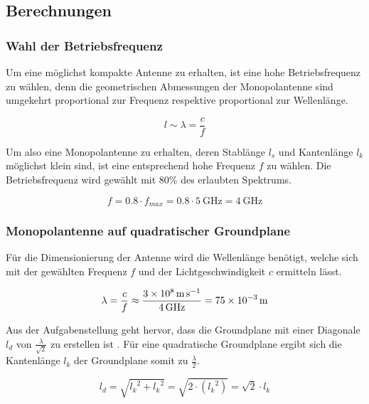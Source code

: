 \subsection{Berechnungen}

\subsubsection{Wahl der Betriebsfrequenz}

Um eine möglichst kompakte Antenne zu erhalten, ist eine hohe
Betriebsfrequenz zu wählen, denn die geometrischen Abmessungen
der Monopolantenne sind umgekehrt proportional zur Frequenz
respektive proportional zur Wellenlänge.

\begin{equation}
	l \sim \lambda = \frac{c}{f}
\end{equation}

Um also eine Monopolantenne zu erhalten, deren Stablänge $l_s$
und Kantenlänge $l_k$ möglichst klein sind, ist eine entsprechend
hohe Frequenz $f$ zu wählen. Die Betriebsfrequenz wird gewählt mit
80\% des erlaubten Spektrums.

\begin{equation}
	f
	= 0.8 \cdot f_{max}
	= 0.8 \cdot \SI{5}{\giga\hertz}
	= \SI{4}{\giga\hertz} 
\end{equation}

\subsubsection{Monopolantenne auf quadratischer Groundplane}

Für die Dimensionierung der Antenne wird die Wellenlänge benötigt,
welche sich mit der gewählten Frequenz $f$ und der Lichtgeschwindigkeit
$c$ ermitteln lässt.

\begin{equation}
	\lambda
	= \frac{c}{f}
	\approx \frac{\SI{3d8}{\meter\per\second}}{\SI{4}{\giga\hertz}}
	= \SI{75d-3}{\meter} 
\end{equation}

Aus der Aufgabenstellung geht hervor, dass die Groundplane mit einer
Diagonale $l_d$ von $\frac{\lambda}{\sqrt{2}}$ zu erstellen ist
\cite[S.1, 2a]{lab1}. Für eine quadratische Groundplane ergibt sich
die Kantenlänge $l_k$ der Groundplane somit zu $\frac{\lambda}{2}$.

\begin{equation}
	l_d
	= \sqrt{{l_k}^2 + {l_k}^2}
	= \sqrt{2 \cdot ({l_k}^2)}
	= \sqrt{2} \cdot l_k
\end{equation}

